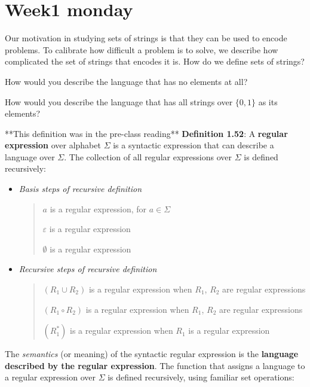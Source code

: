 \documentclass[12pt, oneside]{article}
\begin{document}
\begin{flushright}
\end{flushright} \section*{Week1 monday}


Our motivation in studying sets of strings is that they can be used to encode problems.
To calibrate how difficult a problem is to solve, we describe how complicated the set of strings that encodes it is. 
How do we define sets of strings?


\vfill

How would you describe the language that has no elements at all?

\vfill

How would you describe the language that has all strings over $\{0,1\}$ as its elements?

\vfill

\newpage

**This definition was in the pre-class reading**
{\bf Definition 1.52}: A {\bf regular expression} over alphabet $\Sigma$
is a syntactic expression that can describe a language over $\Sigma$. The collection of all regular
expressions over $\Sigma$ is defined recursively:
\begin{itemize}
\item[] {\it Basis steps of recursive definition}
\begin{quote}    
    $a$ is a regular expression, for $a \in \Sigma$

    $\varepsilon$ is a regular expression

    $\emptyset$ is a regular expression
\end{quote}

\item[] {\it Recursive steps of recursive definition}
\begin{quote}
    $(R_1 \cup R_2)$ is a regular expression when $R_1$, $R_2$ are regular expressions 

    $(R_1 \circ R_2)$ is a regular expression when $R_1$, $R_2$ are regular expressions

    $(R_1^*)$ is a regular expression when $R_1$ is a regular expression 
\end{quote}
\end{itemize}
 

The {\it semantics} (or meaning) of the syntactic regular expression is the {\bf language
described by the regular expression}. The function that assigns a language to a regular expression
over $\Sigma$ is defined recursively, using familiar set operations:
\end{document}
